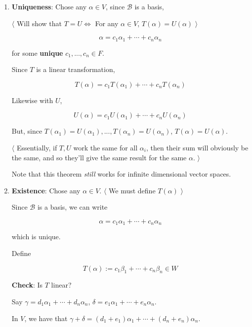 \documentclass[12pt]{article}
\def\B{\mathcal B}
\newcommand{\btw}[1]{
    $\langle$ #1 $\rangle$
}
\begin{document}
    {
      \begin{enumerate}
        \item {\bf Uniqueness}: Chose any $\alpha \in V$, since $\B$ is a basis,

        \btw{
            Will show that $T = U \Leftrightarrow$ For any $\alpha \in V$,
            $T(\alpha) = U(\alpha)$
        }

        \[
          \alpha = c_1 \alpha_1 + \cdots + c_n \alpha_n
        \]
        
        for some {\bf unique} $c_1, ..., c_n \in F$.

        Since $T$ is a linear transformation,

        \[
          T(\alpha) = c_1 T(\alpha_1) + \cdots + c_n T(\alpha_n)
        \]

        Likewise with $U$,

        \[
          U(\alpha) = c_1 U(\alpha_1) + \cdots + c_n U(\alpha_n)
        \]

        But, since $T(\alpha_1) = U(\alpha_1), ..., T(\alpha_n) = U(\alpha_n)$,
        $T(\alpha) = U(\alpha)$.

        \btw{
          Essentially, if $T, U$ work the same for all $\alpha_i$, then their
          sum will obviously be the same, and so they'll give the same result
          for the same $\alpha$.
        }

        Note that this theorem {\it still} works for infinite dimensional
        vector spaces.

      \item {\bf Existence}: Chose any $\alpha \in V$. \btw{ We must define
        $T(\alpha)$}

        Since $\B$ is a basis, we can write

        \[
          \alpha = c_1 \alpha_1 + \cdots + c_n \alpha_n
        \]

        which is unique.

        Define 

        \[
          T(\alpha) := c_1 \beta_1 + \cdots + c_n \beta_n \in W
        \]

        {\bf Check}: Is $T$ linear?

        Say $\gamma = d_1 \alpha_1 + \cdots + d_n \alpha_n$, $\delta = e_1
        \alpha_1 + \cdots + e_n \alpha_n$.

        In $V$, we have that $\gamma + \delta = (d_1 + e_1) \alpha_1 + \cdots +
        (d_n + e_n) \alpha_n$.


\end{enumerate}}
\end{document}
